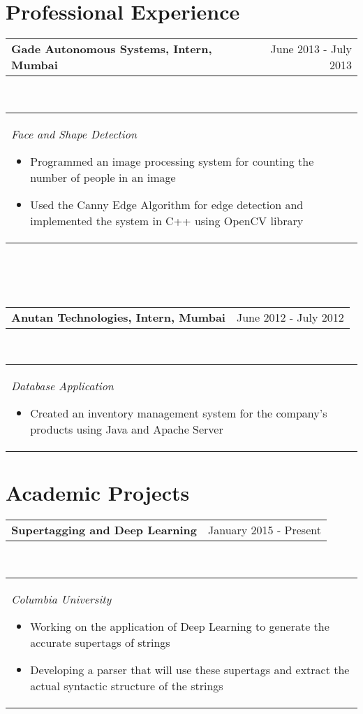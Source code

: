 \documentclass[margin,line]{res}
\begin{document}
\begin{resume}
\section{\sc \bf Professional Experience}
\begin{tabular}{p{4.41in}  r}
\bf Gade Autonomous Systems, Intern, Mumbai  & June 2013 - July 2013
\end{tabular}
\\
\begin{tabular}{p{5.92in}}
\it Face and Shape Detection
\begin{itemize}
    \item \textup {Programmed an image processing system for counting the number of people in an image}
    \item \textup {Used the Canny Edge Algorithm for edge detection and implemented the system in C++ using OpenCV library}
\end{itemize}
\end{tabular}
\\\\\\
\begin{tabular}{p{4.4in}  r}
\bf Anutan Technologies, Intern, Mumbai & June 2012 - July 2012
\end{tabular}
\\
\begin{tabular}{p{5.92in}}
\it Database Application
\begin{itemize}
    \item \textup{Created an inventory management system for the company's products using Java and Apache Server}
\end{itemize}
\end{tabular}



\section{\sc \bf Academic Projects}

\begin{tabular}{p{4.36in} r}
\bf Supertagging and Deep Learning & January 2015 - Present
\end{tabular}\\
\begin{tabular}{p{5.92in}}
\it Columbia University
\begin{itemize}
    \item \textup{Working on the application of Deep Learning to generate the accurate supertags of strings}
    \item \textup{Developing a parser that will use these supertags and extract the actual syntactic structure of the strings}
\end{itemize}
\end{tabular}


\end{resume}
\end{document}
